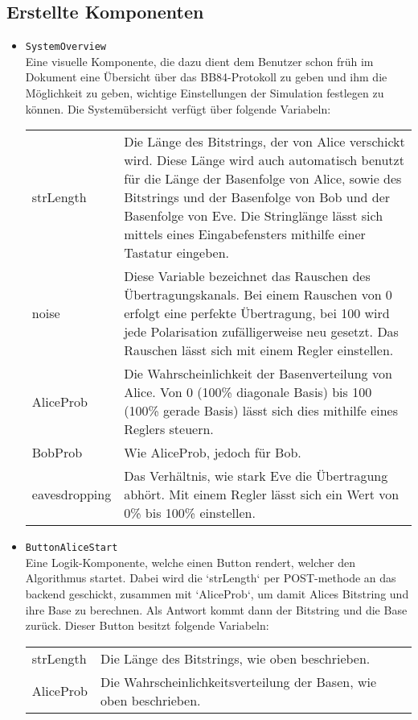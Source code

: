 \documentclass[a4paper,10.2pt,pdftex]{scrartcl}%
\begin{document}
\subsection{Erstellte Komponenten}
\begin{itemize}
\item \texttt{SystemOverview} \\Eine visuelle Komponente, die dazu dient dem Benutzer schon früh im Dokument eine Übersicht über das BB84-Protokoll zu geben und ihm die Möglichkeit zu geben, wichtige Einstellungen der Simulation festlegen zu können. Die Systemübersicht verfügt über folgende Variabeln: \\[3mm]
\begin{tabularx}{\textwidth}{p{3cm}p{11cm}} 
strLength & Die Länge des Bitstrings, der von Alice verschickt wird. Diese Länge wird auch automatisch benutzt für die Länge der Basenfolge von Alice, sowie des Bitstrings und der Basenfolge von Bob und der Basenfolge von Eve. Die Stringlänge lässt sich mittels eines Eingabefensters mithilfe einer Tastatur eingeben. \\
noise & Diese Variable bezeichnet das Rauschen des Übertragungskanals. Bei einem Rauschen von 0 erfolgt eine perfekte Übertragung, bei 100 wird jede Polarisation zufälligerweise neu gesetzt. Das Rauschen lässt sich mit einem Regler einstellen. \\
AliceProb & Die Wahrscheinlichkeit der Basenverteilung von Alice. Von 0 (100\% diagonale Basis) bis 100 (100\% gerade Basis) lässt sich dies mithilfe eines Reglers steuern. \\
BobProb & Wie AliceProb, jedoch für Bob. \\
eavesdropping & Das Verhältnis, wie stark Eve die Übertragung abhört. Mit einem Regler lässt sich ein Wert von 0\% bis 100\% einstellen.
\end{tabularx}
\item \texttt{ButtonAliceStart}\\
Eine Logik-Komponente, welche einen Button rendert, welcher den Algorithmus startet. Dabei wird die `strLength` per POST-methode an das backend geschickt, zusammen mit `AliceProb`, um damit Alices Bitstring und ihre Base zu berechnen. Als Antwort kommt dann der Bitstring und die Base zurück. Dieser Button besitzt folgende Variabeln: \\[3mm]
\begin{tabularx}{\textwidth}{p{3cm}p{11cm}} 
strLength & Die Länge des Bitstrings, wie oben beschrieben. \\
AliceProb & Die Wahrscheinlichkeitsverteilung der Basen, wie oben beschrieben. \\

\end{tabularx}
\end{itemize}
\end{document}
